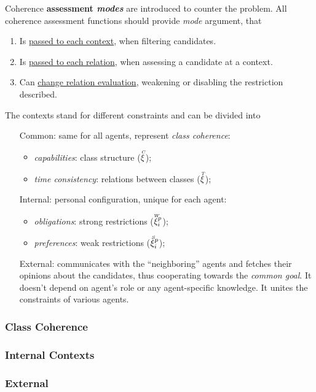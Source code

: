 \documentclass[../ThesisDoc]{subfiles}
\begin{document}
Coherence \textbf{assessment \emph{modes}} are introduced to counter the problem.
All coherence assessment functions should provide \emph{mode} argument, that
\begin{enumerate}
  \item Is \underline{passed to each context}, when filtering candidates.
  \item Is \underline{passed to each relation}, when assessing a candidate at a context.
  \item Can \underline{change relation evaluation}, weakening or disabling the
        restriction described.
\end{enumerate}

\bigskip

\noindent
The contexts stand for different constraints and can be divided into
\begin{itemize}[leftmargin=2cm]
  \item[Common:] same for all agents, represent \emph{class coherence}:
    \begin{itemize}
      \item \emph{capabilities}: class structure ($\accentset{C}{\xi}$);
      \item \emph{time consistency}: relations between classes ($\accentset{T}{\xi}$);
    \end{itemize}
  \item[Internal:] personal configuration, unique for each agent:
    \begin{itemize}
      \item \emph{obligations}: strong restrictions ($\accentset{W}{\xi}^p_i$);
      \item \emph{preferences}: weak restrictions ($\accentset{S}{\xi}^p_i$);
    \end{itemize}
  \item[External:] communicates with the ``neighboring'' agents and fetches
    their opinions about the candidates, thus cooperating towards the
    \emph{common goal}. It doesn't depend on agent's role or
      any agent-specific knowledge. It unites the constraints of various agents.
\end{itemize}


\newcommand{\seccmd}[1]{\secpartc{#1}}
\subsubsection{Class Coherence}

\subsubsection{Internal Contexts}

\subsubsection{External}

\end{document}

